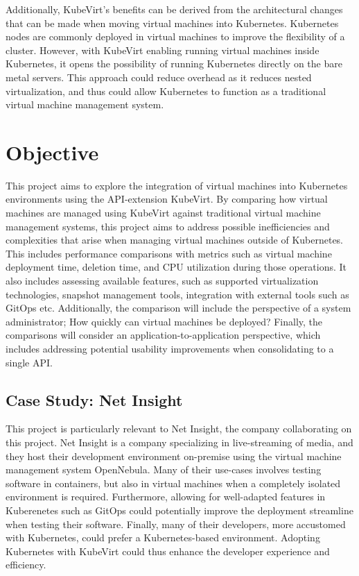 \documentclass{article}
\begin{document}
Additionally, KubeVirt's benefits can be derived from the architectural changes \cite{free-turtles} that can be made when moving virtual machines into Kubernetes. Kubernetes nodes are commonly deployed in virtual machines to improve the flexibility of a cluster. However, with KubeVirt enabling running virtual machines inside Kubernetes, it opens the possibility of running Kubernetes directly on the bare metal servers. This approach could reduce overhead as it reduces nested virtualization, and thus could allow Kubernetes to function as a traditional virtual machine management system. 

\section{Objective}
This project aims to explore the integration of virtual machines into Kubernetes environments using the API-extension KubeVirt. By comparing how virtual machines are managed using KubeVirt against traditional virtual machine management systems, this project aims to address possible inefficiencies and complexities that arise when managing virtual machines outside of Kubernetes. This includes performance comparisons with metrics such as virtual machine deployment time, deletion time, and CPU utilization during those operations. It also includes assessing available features, such as supported virtualization technologies, snapshot management tools, integration with external tools such as GitOps etc. Additionally, the comparison will include the perspective of a system administrator; How quickly can virtual machines be deployed? Finally, the comparisons will consider an application-to-application perspective, which includes addressing potential usability improvements when consolidating to a single API. 

\subsection{Case Study: Net Insight}
This project is particularly relevant to Net Insight, the company collaborating on this project. Net Insight is a company specializing in live-streaming of media, and they host their development environment on-premise using the virtual machine management system OpenNebula. Many of their use-cases involves testing software in containers, but also in virtual machines when a completely isolated environment is required. Furthermore, allowing for well-adapted features in Kuberenetes such as GitOps \cite{k8s-gitops} could potentially improve the deployment streamline when testing their software. Finally, many of their developers, more accustomed with Kubernetes, could prefer a Kubernetes-based environment. Adopting Kubernetes with KubeVirt could thus enhance the developer experience and efficiency.
\end{document}
